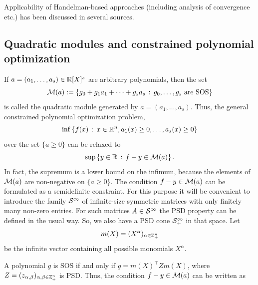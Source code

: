 \begin{remark}
	Applicability of Handelman-based approaches (including analysis of convergence etc.) has been discussed in several sources. 
\end{remark}

\subsection{Quadratic modules and constrained polynomial optimization} 

\label{quadr:modules:pop}

If $a=(a_1,\ldots,a_s) \in \mathbb{R}[X]^s$ are arbitrary polynomials, then the set 
\[
	\mathcal{M}(a):= \left\{ g_0 + g_1 a_1 + \cdots + g_s a_s \,:\, g_0,\ldots,g_s \ \text{are SOS}  \right\}
\]
is called the quadratic module generated by $a=(a_1,\ldots,a_s)$. Thus, the general constrained polynomial optimization problem, 
\begin{equation}
	\label{constr:pop}
	\inf \left\{ f(x) \,:\, x \in \mathbb{R}^n, a_1(x) \ge 0,\ldots, a_s(x) \ge 0 \right\}
\end{equation}
over the set $\{a \ge 0\}$
can be relaxed to
\begin{equation}
	\label{module:relax}
	\sup \left\{ y \in \mathbb{R} \,:\, f - y\in \mathcal{M}(a) \right\}.
\end{equation}
In fact, the supremum is a lower bound on the infimum, because the elements of $\mathcal{M}(a)$ are non-negative on $\{a \ge 0\}$. The condition $f - y \in \mathcal{M}(a)$ can be formulated as a semidefinite constraint. For this purpose it will be convenient to introduce the family $\mathcal{S}^\infty$ of infinite-size symmetric matrices with only finitely many non-zero entries. For such matrices $A \in \mathcal{S}^\infty$ the PSD property can be defined in the usual way. So, we also have a PSD cone $\mathcal{S}_+^\infty$ in that space. Let 
\[
	m(X) = (X^\alpha)_{\alpha \in \mathbb{Z}_+^n}
\] 
be the infinite vector containing all possible monomials $X^\alpha$. 

A polynomial $g$ is SOS if and only if $g=m(X)^\top Z m(X)$, where $Z = (z_{\alpha,\beta})_{\alpha,\beta \in \mathbb{Z}_+^n}$ is PSD. Thus, the condition $f - y \in \mathcal{M}(a)$ can be written as 

